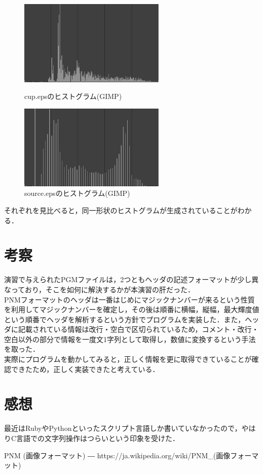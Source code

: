 \documentclass{jsarticle}
\begin{document}
\begin{figure}[htbp]
 \begin{minipage}{0.5\hsize}
  \begin{center}
   \includegraphics[width=70mm]{cup_gimp_histogram}
  \end{center}
  \caption{cup.epsのヒストグラム(GIMP)}
  \label{fig:five}
 \end{minipage}
 \begin{minipage}{0.5\hsize}
  \begin{center}
   \includegraphics[width=70mm]{source_gimp_histogram.png}
  \end{center}
  \caption{source.epsのヒストグラム(GIMP)}
  \label{fig:six}
 \end{minipage}
\end{figure}

それぞれを見比べると，同一形状のヒストグラムが生成されていることがわかる．

\section{考察}

演習で与えられたPGMファイルは，2つともヘッダの記述フォーマットが少し異なっており，そこを如何に解決するかが本演習の肝だった．\\
PNMフォーマットのヘッダは一番はじめにマジックナンバーが来るという性質を利用してマジックナンバーを確定し，その後は順番に横幅，縦幅，最大輝度値という順番でヘッダを解析するという方針でプログラムを実装した．また，ヘッダに記載されている情報は改行・空白で区切られているため，コメント・改行・空白以外の部分で情報を一度文1字列として取得し，数値に変換するという手法を取った．\\
実際にプログラムを動かしてみると，正しく情報を更に取得できていることが確認できたため，正しく実装できたと考えている．

\section{感想}
最近はRubyやPythonといったスクリプト言語しか書いていなかったので，やはりC言語での文字列操作はつらいという印象を受けた．\\

\begin{thebibliography}{99}
	PNM (画像フォーマット) ―  https://ja.wikipedia.org/wiki/PNM\_(画像フォーマット)
\end{thebibliography}
\end{document}
